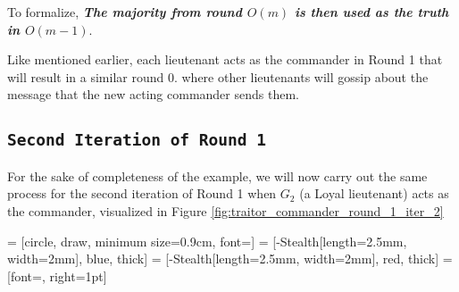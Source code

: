 \documentclass[11pt]{article}
\newcommand{\gen}[1]{\ensuremath{G_{#1}}}
\begin{document}
\vspace{1em}
To formalize, \textbf{\textit{The majority from round $O(m)$ is then used as the truth in $O(m - 1)$}}.
\vspace{1em}

Like mentioned earlier, each lieutenant acts as the commander in Round 1 that will result in a similar round 0. where other lieutenants will gossip about the message that the new acting commander sends them.

\subsection*{\texttt{\large Second Iteration of Round 1}}
For the sake of completeness of the example, we will now carry out the same process for the second iteration of Round 1 when $\gen{2}$ (a Loyal lieutenant) acts as the commander, visualized in Figure \ref{fig:traitor_commander_round_1_iter_2}

 = [circle, draw, minimum size=0.9cm, font=\small]
 = [-{Stealth[length=2.5mm, width=2mm]}, blue, thick] %
 = [-{Stealth[length=2.5mm, width=2mm]}, red, thick]  %
 = [font=\scriptsize, right=1pt]
\end{document}
